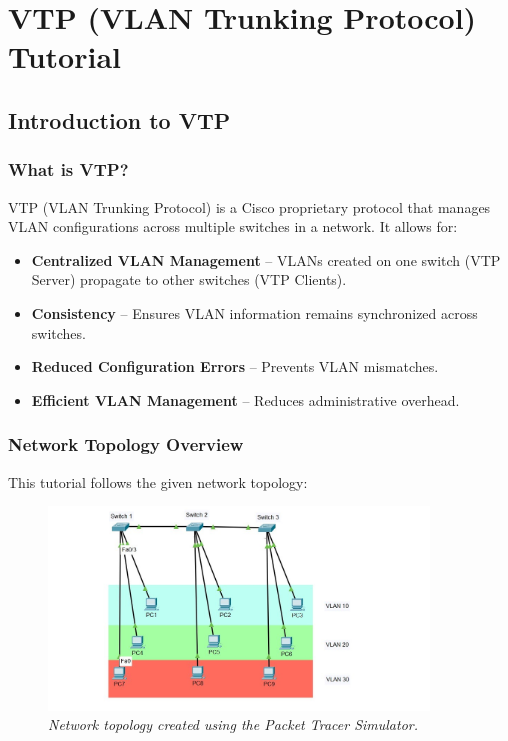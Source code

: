 \documentclass[a4paper]{book}
\begin{document}
\tableofcontents

\chapter{VTP (VLAN Trunking Protocol) Tutorial}

\section{Introduction to VTP}
\subsection{What is VTP?}
VTP (VLAN Trunking Protocol) is a Cisco proprietary protocol that manages VLAN configurations across multiple switches in a network. It allows for:
\begin{itemize}
    \item \textbf{Centralized VLAN Management} – VLANs created on one switch (VTP Server) propagate to other switches (VTP Clients).
    \item \textbf{Consistency} – Ensures VLAN information remains synchronized across switches.
    \item \textbf{Reduced Configuration Errors} – Prevents VLAN mismatches.
    \item \textbf{Efficient VLAN Management} – Reduces administrative overhead.
\end{itemize}

\subsection{Network Topology Overview}
This tutorial follows the given network topology:

\begin{figure}[h]
    \centering
    \includegraphics[width=0.9\textwidth]{network_topology.jpg}
    \caption{\textit{Network topology created using the Packet Tracer Simulator.}}

    \label{fig:packet_tracer_topology}
\end{figure}
\end{document}
